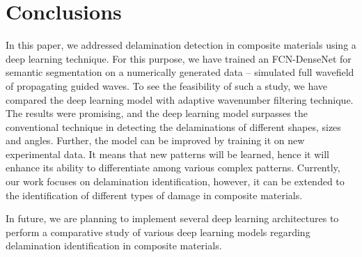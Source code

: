 \section{Conclusions}
In this paper, we addressed delamination detection in composite materials using a deep learning technique. 
For this purpose, we have trained an FCN-DenseNet for semantic segmentation on a numerically generated data -- simulated full wavefield of propagating guided waves.
To see the feasibility of such a study, we have compared the deep learning model with adaptive wavenumber filtering technique.
The results were promising, and the deep learning model surpasses the conventional technique in detecting the delaminations of different shapes, sizes and angles. 
Further, the model can be improved by training it on new experimental data.
It means that new patterns will be learned, hence it will enhance its ability to differentiate among various complex patterns.
Currently, our work focuses on delamination identification, however, it can be extended to the identification of different types of damage in composite materials.

In future, we are planning to implement several deep learning architectures to perform a comparative study of various deep learning models regarding delamination identification in composite materials.